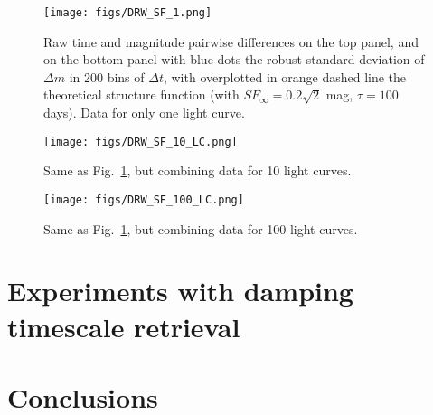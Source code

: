 \documentclass[fleqn,usenatbib]{mnras}  %
\begin{document}
\begin{figure}
\texttt{[image: figs/DRW\_SF\_1.png]}
\caption{Raw time and magnitude pairwise differences on the top panel, and on the bottom panel with blue dots the robust standard deviation of $\Delta m$ in 200 bins of $\Delta t$, with overplotted in orange dashed line the theoretical structure function (with $SF_{\infty}=0.2 \sqrt{2} $ mag, $\tau=100$ days). Data for only one light curve. }
\label{fig:sf_1}
\end{figure}

\begin{figure}
\texttt{[image: figs/DRW\_SF\_10\_LC.png]}
\caption{Same as Fig.~\ref{fig:sf_1}, but combining data for 10 light curves.}
\label{fig:sf_10}
\end{figure}

\begin{figure}
\texttt{[image: figs/DRW\_SF\_100\_LC.png]}
\caption{Same as Fig.~\ref{fig:sf_1}, but combining data for 100 light curves.}
\label{fig:sf_100}
\end{figure}



\section{Experiments with damping timescale retrieval }








\section{Conclusions}
\end{document}
